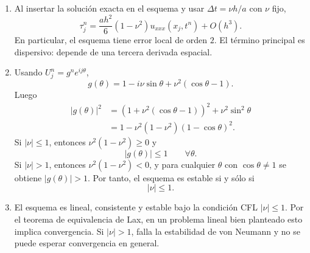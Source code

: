 \documentclass[11pt]{article}
\newcommand{\abs}[1]{\left|#1\right|}
\begin{document}
\begin{enumerate}[label=\textbf{\arabic*.}, leftmargin=*]
\begin{enumerate}[label=(\alph*)]
        \item Al insertar la solución exacta en el esquema y usar $\Delta t=\nu h/a$ con $\nu$ fijo,
        \[
            \tau_j^n
            =
            \frac{a h^2}{6}(1-\nu^2)u_{xxx}(x_j,t^n)+O(h^3).
        \]
        En particular, el esquema tiene error local de orden $2$. El término principal es dispersivo: depende de una tercera derivada espacial.

        \item Usando $U_j^n=g^n e^{ij\theta}$,
        \[
            g(\theta)
            =
            1-i\nu\sin\theta+\nu^2(\cos\theta-1).
        \]
        Luego
        \begin{align*}
            \abs{g(\theta)}^2
            &=
            \left(1+\nu^2(\cos\theta-1)\right)^2+\nu^2\sin^2\theta\\
            &=
            1-\nu^2(1-\nu^2)(1-\cos\theta)^2.
        \end{align*}
        Si $\abs{\nu}\le1$, entonces $\nu^2(1-\nu^2)\ge0$ y
        \[
            \abs{g(\theta)}\le1
            \qquad\forall \theta.
        \]
        Si $\abs{\nu}>1$, entonces $\nu^2(1-\nu^2)<0$, y para cualquier $\theta$ con $\cos\theta\neq1$ se obtiene $\abs{g(\theta)}>1$. Por tanto, el esquema es estable si y sólo si
        \[
            \abs{\nu}\le1.
        \]

        \item El esquema es lineal, consistente y estable bajo la condición CFL $\abs{\nu}\le1$. Por el teorema de equivalencia de Lax, en un problema lineal bien planteado esto implica convergencia. Si $\abs{\nu}>1$, falla la estabilidad de von Neumann y no se puede esperar convergencia en general.
    \end{enumerate}

\end{enumerate}
\end{document}
